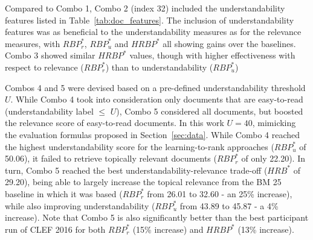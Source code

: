 Compared to Combo 1, Combo 2 (index 32) included the understandability features listed in Table~\ref{tab:doc_features}. The inclusion of understandability features was as beneficial to the understandability measures as for the relevance measures, with $RBP_r^*$, $RBP_u^*$ and $HRBP^*$ all showing gains over the baselines. Combo 3 showed similar $HRBP^*$ values, though with higher effectiveness with respect to relevance ($RBP_r^*$) than to understandability ($RBP_u^*$)


Combos 4 and 5 were devised based on a pre-defined understandability threshold $U$. While Combo 4 took into consideration only documents that are easy-to-read (understandability label $\le$ $U$), Combo 5 considered all documents, but boosted the relevance score of easy-to-read documents. In this work $U=40$, mimicking the evaluation formulas proposed in Section~\ref{sec:data}. While Combo 4 reached the highest understandability score for the learning-to-rank approaches ($RBP_u^{*}$ of 50.06), it failed to retrieve topically relevant documents ($RBP_r^{*}$ of only 22.20). In turn, Combo 5 reached the best understandability-relevance trade-off ($HRB^{*}$ of 29.20), being able to largely increase the topical relevance from the BM 25 baseline in which it was based ($RBP_r^*$ from 26.01 to 32.60 - an 25\% increase), while also improving understandability ($RBP_u^*$ from 43.89 to 45.87 - a 4\% increase). Note that Combo 5 is also significantly better than the best participant run of
CLEF 2016 for both $RBP_r^{*}$ (15\% increase) and $HRBP^{*}$ (13\% increase).


